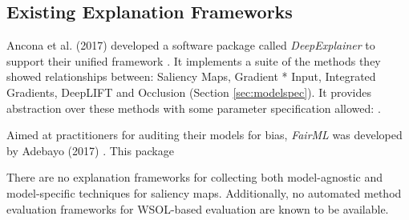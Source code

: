 \documentclass[main]{subfiles}
\begin{document}





\subsection{Existing Explanation Frameworks}

Ancona et al. (2017) developed a software package called \textit{DeepExplainer} to support their unified framework \cite{deepexplainerrepo}. It implements a suite of the methods they showed relationships between: Saliency Maps, Gradient * Input, Integrated Gradients, DeepLIFT and Occlusion (Section \ref{sec:modelspec}). It provides abstraction over these methods with some parameter specification allowed: .

Aimed at practitioners for auditing their models for bias, \textit{FairML} was developed by Adebayo (2017) \cite{fairml}. This package

There are no explanation frameworks for collecting both model-agnostic and model-specific techniques for saliency maps. Additionally, no automated method evaluation frameworks for WSOL-based evaluation are known to be available.






\end{document}
